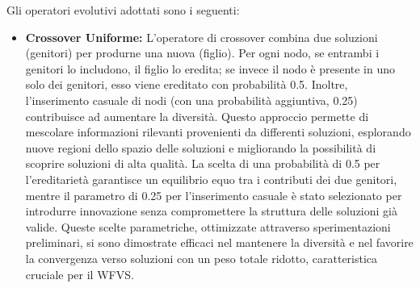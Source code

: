 \documentclass[12pt,a4paper,twoside]{article}
\begin{document}
\noindent Gli operatori evolutivi adottati sono i seguenti:
\begin{itemize}
    \item \textbf{Crossover Uniforme:} L'operatore di crossover combina due soluzioni (genitori) per produrne una nuova (figlio). Per ogni nodo, se entrambi i genitori lo includono, il figlio lo eredita; se invece il nodo è presente in uno solo dei genitori, esso viene ereditato con probabilità 0.5. Inoltre, l'inserimento casuale di nodi (con una probabilità aggiuntiva, 0.25) contribuisce ad aumentare la diversità. Questo approccio permette di mescolare informazioni rilevanti provenienti da differenti soluzioni, esplorando nuove regioni dello spazio delle soluzioni e migliorando la possibilità di scoprire soluzioni di alta qualità.  
La scelta di una probabilità di 0.5 per l'ereditarietà garantisce un equilibrio equo tra i contributi dei due genitori, mentre il parametro di 0.25 per l'inserimento casuale è stato selezionato per introdurre innovazione senza compromettere la struttura delle soluzioni già valide. Queste scelte parametriche, ottimizzate attraverso sperimentazioni preliminari, si sono dimostrate efficaci nel mantenere la diversità e nel favorire la convergenza verso soluzioni con un peso totale ridotto, caratteristica cruciale per il WFVS.


\end{itemize}
\end{document}
